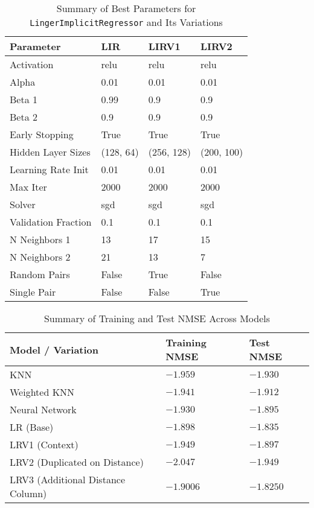 \documentclass[a4paper, 12pt]{report}
\begin{document}
\begin{table}[H]
    \centering
    \caption{Summary of Best Parameters for \texttt{LingerImplicitRegressor} and Its Variations}
    \label{tab:best_parameters_LingerImageRegressor_variations_exp2}
    \footnotesize
    \begin{tabular}{|l|l|l|l|}
    \hline
    \textbf{Parameter} & \textbf{LIR} & \textbf{LIRV1} & \textbf{LIRV2} \\
    \hline
    Activation & relu & relu & relu \\
    Alpha & 0.01 & 0.01 & 0.01 \\
    Beta 1 & 0.99 & 0.9 & 0.9 \\
    Beta 2 & 0.9 & 0.9 & 0.9 \\
    Early Stopping & True & True & True \\
    Hidden Layer Sizes & (128, 64) & (256, 128) & (200, 100) \\
    Learning Rate Init & 0.01 & 0.01 & 0.01 \\
    Max Iter & 2000 & 2000 & 2000 \\
    Solver & sgd & sgd & sgd \\
    Validation Fraction & 0.1 & 0.1 & 0.1 \\
    N Neighbors 1 & 13 & 17 & 15 \\
    N Neighbors 2 & 21 & 13 & 7 \\
    Random Pairs & False & True & False \\
    Single Pair & False & False & True \\
    \hline
    \end{tabular}
\end{table}

\begin{table}[H]
    \centering
    \caption{Summary of Training and Test NMSE Across Models}
    \label{tab:summary_nmse_all_models_MNSE_exp2}
    \footnotesize
    \begin{tabular}{|l|l|l|}
    \toprule
    \textbf{Model / Variation} & \textbf{Training NMSE} & \textbf{Test NMSE} \\
    \midrule
    KNN & $-1.959$ & $-1.930$ \\
    Weighted KNN & $-1.941$ & $-1.912$ \\
    Neural Network & $-1.930$ & $-1.895$ \\
    LR (Base) & $-1.898$ & $-1.835$ \\
    LRV1 (Context) & $-1.949$ & $-1.897$ \\
    LRV2 (Duplicated on Distance) & $-2.047$ & $-1.949$ \\
    LRV3 (Additional Distance Column) & $-1.9006$ & $\mathbf{-1.8250}$ \\
    \bottomrule
    \end{tabular}
\end{table}
\end{document}
